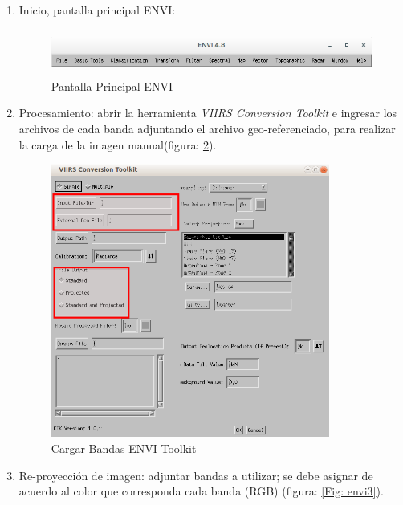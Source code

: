 \begin{enumerate}

\item Inicio, pantalla principal ENVI:
	\begin{figure}[H]\centering
		\includegraphics[height=1.5cm,keepaspectratio=true,clip=true]{imagenes/RecolecciondeDatos/envi1.png}
  		\caption{Pantalla Principal ENVI} \label{Fig: envi1}
	\end{figure}


\item Procesamiento: abrir la herramienta \textit{VIIRS Conversion Toolkit} e ingresar los archivos de cada banda adjuntando el archivo  geo-referenciado, para realizar la carga de la imagen manual(figura: \ref{Fig: envi2}).

\begin{figure}[H] \centering
  \includegraphics[height=9cm,keepaspectratio=true,clip=true]{imagenes/RecolecciondeDatos/envi2.png}
  \caption{Cargar Bandas ENVI Toolkit} \label{Fig: envi2}
\end{figure}

\item Re-proyección de imagen: adjuntar bandas a utilizar; se debe asignar de acuerdo al color que corresponda cada banda (RGB) (figura: \ref{Fig: envi3}).
 

\end{enumerate}
